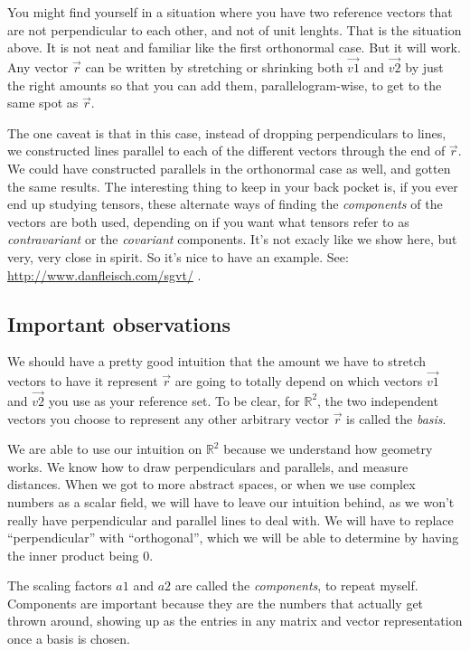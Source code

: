 \documentclass[
]{book}
\begin{document}
You might find yourself in a situation where you have two reference vectors that are not perpendicular to each other, and not of unit lenghts. That is the situation above. It is not neat and familiar like the first orthonormal case. But it will work. Any vector \(\vec{r}\) can be written by stretching or shrinking both \(\vec{v1}\) and \(\vec{v2}\) by just the right amounts so that you can add them, parallelogram-wise, to get to the same spot as \(\vec{r}\).

The one caveat is that in this case, instead of dropping perpendiculars to lines, we constructed lines parallel to each of the different vectors through the end of \(\vec{r}\). We could have constructed parallels in the orthonormal case as well, and gotten the same results. The interesting thing to keep in your back pocket is, if you ever end up studying tensors, these alternate ways of finding the \emph{components} of the vectors are both used, depending on if you want what tensors refer to as \emph{contravariant} or the \emph{covariant} components. It's not exacly like we show here, but very, very close in spirit. So it's nice to have an example. See: \url{http://www.danfleisch.com/sgvt/} .

\hypertarget{important-observations}{%
\subsection{Important observations}\label{important-observations}}

We should have a pretty good intuition that the amount we have to stretch vectors to have it represent \(\vec{r}\) are going to totally depend on which vectors \(\vec{v1}\) and \(\vec{v2}\) you use as your reference set. To be clear, for \(\mathbb{R}^2\), the two independent vectors you choose to represent any other arbitrary vector \(\vec{r}\) is called the \emph{basis}.

We are able to use our intuition on \(\mathbb{R}^2\) because we understand how geometry works. We know how to draw perpendiculars and parallels, and measure distances. When we got to more abstract spaces, or when we use complex numbers as a scalar field, we will have to leave our intuition behind, as we won't really have perpendicular and parallel lines to deal with. We will have to replace ``perpendicular'' with ``orthogonal'', which we will be able to determine by having the inner product being 0.

The scaling factors \(a1\) and \(a2\) are called the \emph{components}, to repeat myself. Components are important because they are the numbers that actually get thrown around, showing up as the entries in any matrix and vector representation once a basis is chosen.
\end{document}
